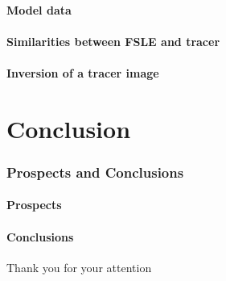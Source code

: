 \documentclass[compress,slidescentered,notes=show]{beamer}
\begin{document}
	\subsection{Model data}
\begin{frame}
\end{frame}

	\subsection{Similarities between FSLE and tracer}
\begin{frame}
\end{frame}

	\subsection{Inversion of a tracer image}
\begin{frame}
\end{frame}

\part{Conclusion}
\section{Prospects and Conclusions}

	\subsection{Prospects}
\begin{frame}
\end{frame}

	\subsection{Conclusions}
\begin{frame}
\end{frame}

\begin{frame}
\begin{center}
Thank you for your attention 
\end{center}
\end{frame}
\end{document}
